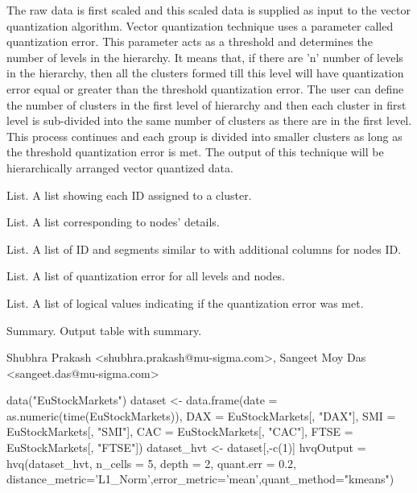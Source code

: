 \documentclass[letterpaper]{book}
\begin{document}
%
\begin{Details}
The raw data is first scaled and this scaled data is supplied as input to
the vector quantization algorithm. Vector quantization technique uses a
parameter called quantization error. This parameter acts as a threshold and
determines the number of levels in the hierarchy. It means that, if there
are 'n' number of levels in the hierarchy, then all the clusters formed till
this level will have quantization error equal or greater than the threshold
quantization error. The user can define the number of clusters in the first
level of hierarchy and then each cluster in first level is sub-divided into
the same number of clusters as there are in the first level. This process
continues and each group is divided into smaller clusters as long as the
threshold quantization error is met. The output of this technique will be
hierarchically arranged vector quantized data.
\end{Details}
%
\begin{Value}
\begin{ldescription}
\item[\code{clusters}]  List. A list showing each ID assigned to a cluster.
\item[\code{nodes.clust}]  List. A list corresponding to nodes' details. 
\item[\code{idnodes}]  List. A list of ID and segments similar to 
 with additional columns for nodes ID. 
\item[\code{error.quant}]  List. A list of quantization error for all levels and
nodes. \item[\code{plt.clust}]  List. A list of logical values indicating if the
quantization error was met. \item[\code{summary}]  Summary. Output table with
summary. 
\end{ldescription}
\end{Value}
%
\begin{Author}
Shubhra Prakash <shubhra.prakash@mu-sigma.com>, Sangeet Moy Das <sangeet.das@mu-sigma.com>
\end{Author}
%
\begin{SeeAlso}
\end{SeeAlso}
%
\begin{Examples}
\begin{ExampleCode}
data("EuStockMarkets")
dataset <- data.frame(date = as.numeric(time(EuStockMarkets)),
DAX = EuStockMarkets[, "DAX"],
SMI = EuStockMarkets[, "SMI"],
CAC = EuStockMarkets[, "CAC"],
FTSE = EuStockMarkets[, "FTSE"])
dataset_hvt <- dataset[,-c(1)]
hvqOutput = hvq(dataset_hvt, n_cells = 5, depth = 2, quant.err = 0.2,
distance_metric='L1_Norm',error_metric='mean',quant_method="kmeans")
\end{ExampleCode}
\end{Examples}
\end{document}
